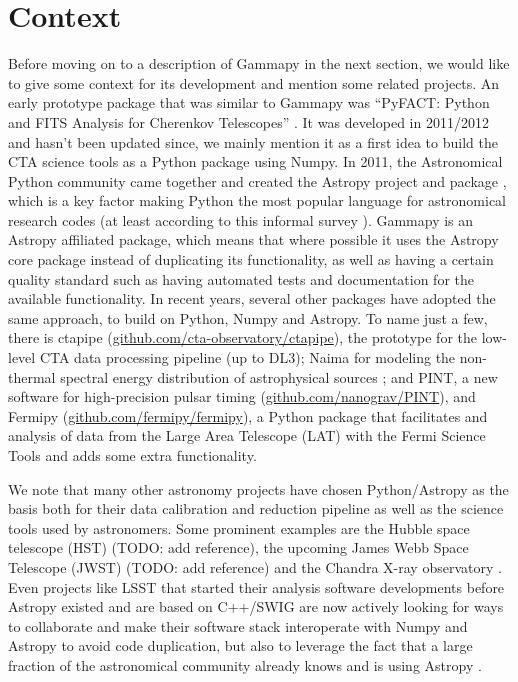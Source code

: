 \documentclass{PoS}
\newcommand{\urlCtaPipe}{\href{https://github.com/cta-observatory/ctapipe}{github.com/cta-observatory/ctapipe}}
\newcommand{\urlPint}{\href{https://github.com/nanograv/PINT}{github.com/nanograv/PINT}}
\newcommand{\urlFermipy}{\href{https://github.com/fermipy/fermipy}{github.com/fermipy/fermipy}}
\begin{document}
\section{Context}
\label{sec:context}

Before moving on to a description of Gammapy in the next section, we would like
to give some context for its development and mention some related projects. An
early prototype package that was similar to Gammapy was ``PyFACT: Python and
FITS Analysis for Cherenkov Telescopes'' \cite{pyfact}. It was developed in
2011/2012 and hasn't been updated since, we mainly mention it as a first  idea
to build the CTA science tools as a Python package using Numpy. In 2011, the
Astronomical Python community came together and created the Astropy project and
package \cite{astropy}, which is a key factor making Python the most popular
language for astronomical research codes (at least according to this informal
survey \cite{momcheva2015}). Gammapy is an Astropy affiliated package, which
means that where possible it uses the Astropy core package instead of
duplicating its functionality, as well as having a certain quality standard such
as having automated tests and documentation for the available functionality. In
recent years, several other packages have adopted the same approach, to build on
Python, Numpy and Astropy. To name just a few, there is ctapipe (\urlCtaPipe),
the prototype for the low-level CTA data processing pipeline (up to DL3); Naima
for modeling the non-thermal spectral energy distribution of astrophysical
sources \cite{naima}; and PINT, a new software for high-precision pulsar timing
(\urlPint), and Fermipy (\urlFermipy), a Python package that facilitates and
analysis of data from the Large Area Telescope (LAT) with the Fermi Science
Tools and adds some extra functionality.

We note that many other astronomy projects have chosen Python/Astropy as the
basis both for their data calibration and reduction pipeline as well as the
science tools used by astronomers. Some prominent examples are the Hubble space
telescope (HST) (TODO: add reference), the upcoming James Webb Space Telescope
(JWST) (TODO: add reference) and the Chandra X-ray observatory \cite{chandra,
sherpa2001}. Even projects like LSST that started their analysis software
developments before Astropy existed and are based on C++/SWIG are now actively
looking for ways to collaborate and make their software stack interoperate with
Numpy and Astropy to avoid code duplication, but also to leverage the fact that
a large fraction of the astronomical community already knows and is using
Astropy \cite{lsst}.
\end{document}
